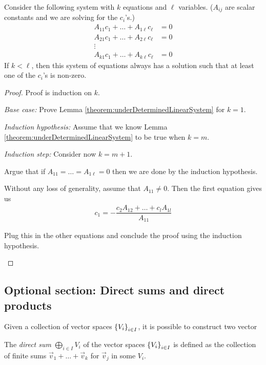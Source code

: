 \begin{lemma}
  \label{theorem:underDeterminedLinearSystem}
  Consider the following system with $k$ equations and $\ell$ variables. ($A_{ij}$ are scalar constants and we are solving for the $c_i$'s.)
  \begin{align*}
    A_{11} c_1 + \dots + A_{1\ell}c_\ell  &= 0 \\
    A_{21} c_1 + \dots + A_{2\ell}c_\ell  &= 0 \\
    \vdots \\
    A_{k1} c_1 + \dots +  A_{k\ell}c_\ell &= 0
  \end{align*}
  If $k < \ell$, then this system of equations always has a solution such that at least one of the $c_i$'s is non-zero.
\end{lemma}
\begin{proof}
  Proof is induction on $k$.
  \begin{qbox}
    \emph{Base case: }Prove Lemma \ref{theorem:underDeterminedLinearSystem} for $k = 1$.
  \end{qbox}
  \emph{Induction hypothesis: }
  Assume that we know Lemma \ref{theorem:underDeterminedLinearSystem} to be true when $k = m$.

  \emph{Induction step: }
  Consider now $k = m+1$.
  \begin{qbox}
    Argue that if $A_{11} = \dots = A_{1\ell} = 0$ then we are done by the induction hypothesis.
  \end{qbox}
  Without any loss of generality, assume that $A_{11} \neq 0$. Then the first equation gives us
  \begin{align*}
    c_1 = -\dfrac{c_2 A_{12} + \dots + c_l A_{1l}}{A_{11}}
  \end{align*}
  \begin{qbox}
    Plug this in the other equations and conclude the proof using the induction hypothesis.
  \end{qbox}
\end{proof}

\iffalse






\subsection{Optional section: Direct sums and direct products}
Given a collection of vector spaces $\left\{V_i\right\}_{i \in I}$, it is possible to construct two vector
\begin{definition}
  The \emph{direct sum} $\bigoplus_{i \in I} V_i$ of the vector spaces $\left\{V_i\right\}_{i \in I}$ is defined as the collection of finite sums $\vec{v}_1 + \dots + \vec{v}_k$ for $\vec{v}_j$ in some $V_i$.
\end{definition}

